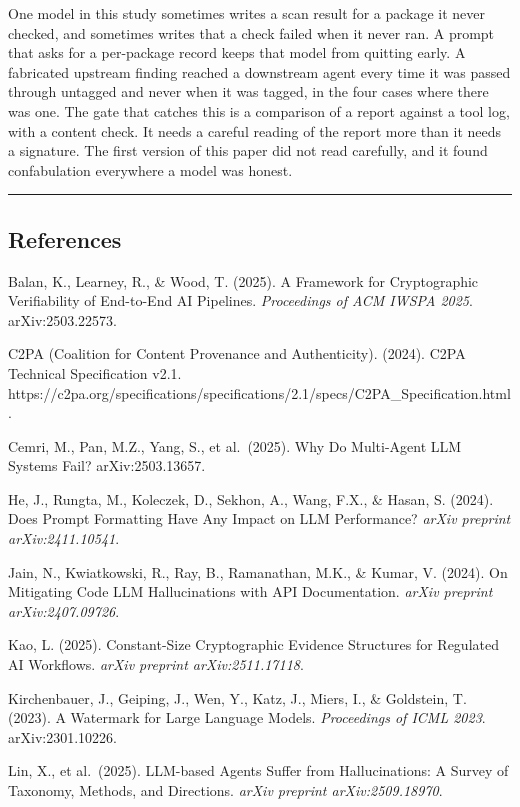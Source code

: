\documentclass[
]{article}
\begin{document}
One model in this study sometimes writes a scan result for a package it
never checked, and sometimes writes that a check failed when it never
ran. A prompt that asks for a per-package record keeps that model from
quitting early. A fabricated upstream finding reached a downstream agent
every time it was passed through untagged and never when it was tagged,
in the four cases where there was one. The gate that catches this is a
comparison of a report against a tool log, with a content check. It
needs a careful reading of the report more than it needs a signature.
The first version of this paper did not read carefully, and it found
confabulation everywhere a model was honest.

\begin{center}\rule{0.5\linewidth}{0.5pt}\end{center}

\subsection{References}\label{references}

Balan, K., Learney, R., \& Wood, T. (2025). A Framework for
Cryptographic Verifiability of End-to-End AI Pipelines.
\emph{Proceedings of ACM IWSPA 2025}. arXiv:2503.22573.

C2PA (Coalition for Content Provenance and Authenticity). (2024). C2PA
Technical Specification v2.1.
https://c2pa.org/specifications/specifications/2.1/specs/C2PA\_Specification.html.

Cemri, M., Pan, M.Z., Yang, S., et al.~(2025). Why Do Multi-Agent LLM
Systems Fail? arXiv:2503.13657.

He, J., Rungta, M., Koleczek, D., Sekhon, A., Wang, F.X., \& Hasan, S.
(2024). Does Prompt Formatting Have Any Impact on LLM Performance?
\emph{arXiv preprint arXiv:2411.10541}.

Jain, N., Kwiatkowski, R., Ray, B., Ramanathan, M.K., \& Kumar, V.
(2024). On Mitigating Code LLM Hallucinations with API Documentation.
\emph{arXiv preprint arXiv:2407.09726}.

Kao, L. (2025). Constant-Size Cryptographic Evidence Structures for
Regulated AI Workflows. \emph{arXiv preprint arXiv:2511.17118}.

Kirchenbauer, J., Geiping, J., Wen, Y., Katz, J., Miers, I., \&
Goldstein, T. (2023). A Watermark for Large Language Models.
\emph{Proceedings of ICML 2023}. arXiv:2301.10226.

Lin, X., et al.~(2025). LLM-based Agents Suffer from Hallucinations: A
Survey of Taxonomy, Methods, and Directions. \emph{arXiv preprint
arXiv:2509.18970}.
\end{document}
